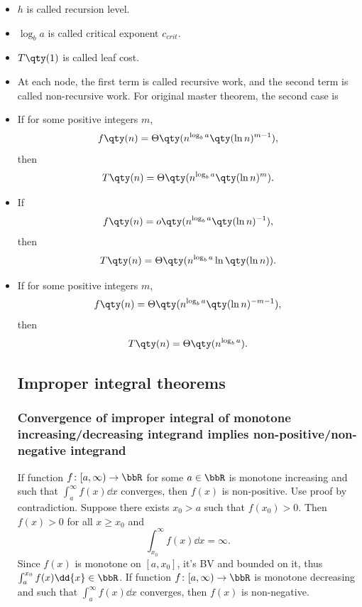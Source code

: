 \documentclass[a4paper,12pt]{report}
\begin{document}
\begin{itemize}
\begin{itemize}
Sub-case 1 $m>0$:
\[T\qty(n)=\Theta\qty(n^{\log_ba}\qty(L_{k}\qty(n))^m).\]
Sub-case 2 $m=0$:
\[T\qty(n)=\Theta\qty(n^{\log_ba}L_{k-1}\qty(n)).\]
Sub-case 3 $m<0$:
\[T\qty(n)=\Theta\qty(n^{\log_ba}).\]
Case 3: If $f\qty(n)=\Omega\qty(n^c)$ for some $c>\log_ba$, and the regularity condition that $\exists m\in\bbR,0<k<1$ such that $n\ge m$ implies
\[af\qty(\frac{n}{b})\le kf\qty(n)\]
is satisfied, then
\[af\qty(\frac{n}{b})\le kf\qty(n)\]
\[a^jf\qty(\frac{n}{b^j})\le a^{j-1}kf\qty(\frac{n}{b^{j-1}})\le k^jf\qty(n)\]
\[\ba
T\qty(n)=&\sum_{j=0}^{h-1}a^jf\qty(\frac{n}{b^j})+n^sT\qty(1)\\
=&f\qty(n)+\sum_{j=1}^{h-1}O\qty(k^jf\qty(n))+\Theta\qty(n^s)
\ea\]
\[\sum_{j=1}^{\infty}k^jf\qty(n)=\frac{f\qty(n)}{1-k}=O(f(n))\]
\[\Theta\qty(n^s)=O(f(n))\]
\[T\qty(n)=f\qty(n)+O\qty(f\qty(n))+O(f(n))=\Theta\qty(f\qty(n))\]
\epr
Terms:
\bit
\item $h$ is called recursion level.
\item $\log_ba$ is called critical exponent $c_{crit}$.
\item $T\qty(1)$ is called leaf cost.
\item At each node, the first term is called recursive work, and the second term is called non-recursive work.
\eit
For original master theorem, the second case is
\ben
\item If for some positive integers $m$, 
\[f\qty(n)=\Theta\qty(n^{\log_ba}\qty(\ln n)^{m-1}),\]
then
\[T\qty(n)=\Theta\qty(n^{\log_ba}\qty(\ln n)^m).\]
\item If
\[f\qty(n)=o\qty(n^{\log_ba}\qty(\ln n)^{-1}),\]
then
\[T\qty(n)=\Theta\qty(n^{\log_ba}\ln\qty(\ln n)).\]
\item If for some positive integers $m$,
\[f\qty(n)=\Theta\qty(n^{\log_ba}\qty(\ln n)^{-m-1}),\]
then
\[T\qty(n)=\Theta\qty(n^{\log_ba}).\]
\een
\subsection{Improper integral theorems}
\subsubsection{Convergence of improper integral of monotone increasing/decreasing integrand implies non-positive/non-negative integrand}
If function $f\colon[a,\infty)\to\bbR$ for some $a\in\bbR$ is monotone increasing and such that $\int_a^{\infty}f(x)\dd{x}$ converges, then $f(x)$ is non-positive.
\bpr
Use proof by contradiction. Suppose there exists $x_0>a$ such that $f(x_0)>0$. Then $f(x)>0$ for all $x\ge x_0$ and
\[\int_{x_0}^{\infty}f(x)\dd{x}=\infty.\]
Since $f(x)$ is monotone on $[a,x_0]$, it's BV and bounded on it, thus $\int_a^{x_0}f(x)\dd{x}\in\bbR$.
\epr
If function $f\colon[a,\infty)\to\bbR$ is monotone decreasing and such that $\int_a^{\infty}f(x)\dd{x}$ converges, then $f(x)$ is non-negative.

\end{itemize}
\end{itemize}
\end{document}
